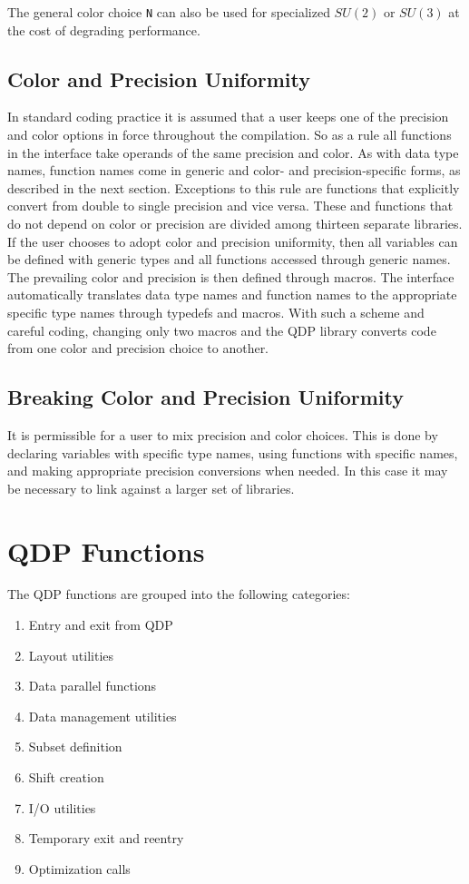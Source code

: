\documentclass{article}
\begin{document}
The general color choice {\tt N} can also be used for specialized
$SU(2)$ or $SU(3)$ at the cost of degrading performance.

\subsection{Color and Precision Uniformity}

In standard coding practice it is assumed that a user keeps one of the
precision and color options in force throughout the compilation.  So
as a rule all functions in the interface take operands of the same
precision and color.  As with data type names, function names come in
generic and color- and precision-specific forms, as described in the
next section.  Exceptions to this rule are functions that explicitly
convert from double to single precision and vice versa.  These and
functions that do not depend on color or precision are divided among
thirteen separate libraries.  If the user chooses to adopt color and
precision uniformity, then all variables can be defined with generic
types and all functions accessed through generic names.  The
prevailing color and precision is then defined through macros.  The
interface automatically translates data type names and function names
to the appropriate specific type names through typedefs and macros.
With such a scheme and careful coding, changing only two macros and
the QDP library converts code from one color and precision choice to
another.

\subsection{Breaking Color and Precision Uniformity}

It is permissible for a user to mix precision and color choices.  This
is done by declaring variables with specific type names, using
functions with specific names, and making appropriate precision
conversions when needed.  In this case it may be necessary to link
against a larger set of libraries.

\section{QDP Functions}

The QDP functions are grouped into the following categories:
\begin{enumerate}
\item Entry and exit from QDP
\item Layout utilities
\item Data parallel functions
\item Data management utilities
\item Subset definition
\item Shift creation
\item I/O utilities
\item Temporary exit and reentry
\item Optimization calls
\end{enumerate}
\end{document}
